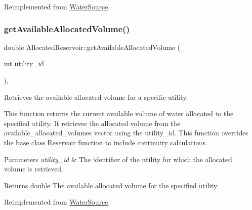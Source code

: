 Reimplemented from \mbox{\hyperlink{classWaterSource_ab98528c4d2e6ecd14cb2c813b1d445c6}{Water\+Source}}.

\mbox{\label{classAllocatedReservoir_ae161ebfc285aa69cb8b7f4fe20ee7a2e}} 
\subsubsection{\texorpdfstring{get\+Available\+Allocated\+Volume()}{getAvailableAllocatedVolume()}}
{\footnotesize\ttfamily double Allocated\+Reservoir\+::get\+Available\+Allocated\+Volume (\begin{DoxyParamCaption}\item[{int}]{utility\+\_\+id }\end{DoxyParamCaption})\hspace{0.3cm}{\ttfamily [override]}, {\ttfamily [virtual]}}



Retrieves the available allocated volume for a specific utility. 

This function returns the current available volume of water allocated to the specified utility. It retrieves the allocated volume from the {\ttfamily available\+\_\+allocated\+\_\+volumes} vector using the {\ttfamily utility\+\_\+id}. This function overrides the base class {\ttfamily \mbox{\hyperlink{classReservoir}{Reservoir}}} function to include continuity calculations.


\begin{DoxyParams}{Parameters}
{\em utility\+\_\+id} & The identifier of the utility for which the allocated volume is retrieved.\\
\hline
\end{DoxyParams}
\begin{DoxyReturn}{Returns}
double The available allocated volume for the specified utility. 
\end{DoxyReturn}


Reimplemented from \mbox{\hyperlink{classWaterSource_ad4667296dc6b6dabc36b871529ca2749}{Water\+Source}}.

\mbox{\label{classAllocatedReservoir_a114e9cde6a106b786ca0ed39283cbbed}} 
